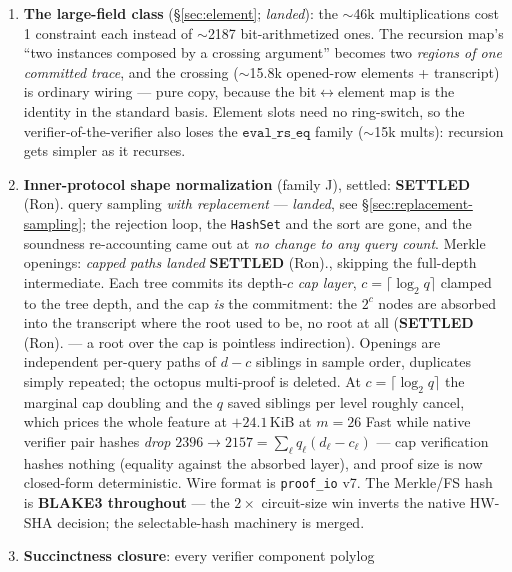 \documentclass[11pt]{article}
\newcommand{\code}[1]{\texttt{#1}}
\newcommand{\settled}[1]{\medskip\noindent\textbf{SETTLED} (#1).\xspace}
\theoremstyle{definition}
\begin{document}
\begin{enumerate}[nosep]
  \item \textbf{The large-field class} (\S\ref{sec:element};
        \emph{landed}): the $\sim$46k multiplications cost 1 constraint
        each instead of $\sim$2187 bit-arithmetized ones. The recursion
        map's ``two instances composed by a crossing argument'' becomes
        two \emph{regions of one committed trace}, and the crossing
        ($\sim$15.8k opened-row elements + transcript) is ordinary wiring
        --- pure copy, because the bit$\leftrightarrow$element map is the
        identity in the standard basis. Element slots need no
        ring-switch, so the verifier-of-the-verifier also loses the
        $\code{eval\_rs\_eq}$ family ($\sim$15k mults): recursion gets
        simpler as it recurses.
  \item \textbf{Inner-protocol shape normalization} (family J), settled:
        \settled{Ron} query sampling \emph{with replacement} ---
        \emph{landed}, see \S\ref{sec:replacement-sampling}; the rejection
        loop, the \code{HashSet} and the sort are gone, and the soundness
        re-accounting came out at \emph{no change to any query count}.
        Merkle openings: \emph{capped paths landed} \settled{Ron},
        skipping the full-depth intermediate. Each tree commits its
        depth-$c$ \emph{cap layer}, $c = \lceil \log_2 q \rceil$ clamped
        to the tree depth, and the cap \emph{is} the commitment: the
        $2^c$ nodes are absorbed into the transcript where the root used
        to be, no root at all (\settled{Ron} --- a root over the cap is
        pointless indirection). Openings are independent per-query paths
        of $d-c$ siblings in sample order, duplicates simply repeated;
        the octopus multi-proof is deleted. At $c = \lceil \log_2 q
        \rceil$ the marginal cap doubling and the $q$ saved siblings per
        level roughly cancel, which prices the whole feature at
        $+24.1$\,KiB at $m{=}26$ Fast while native verifier pair hashes
        \emph{drop} $2396 \to 2157 = \sum_\ell q_\ell (d_\ell -
        c_\ell)$ --- cap verification hashes nothing (equality against
        the absorbed layer), and proof size is now closed-form
        deterministic. Wire format is \code{proof\_io} v7.
        The Merkle/FS hash is \textbf{BLAKE3 throughout} --- the
        $2\times$ circuit-size win inverts the native HW-SHA decision;
        the selectable-hash machinery is merged.
  \item \textbf{Succinctness closure}: every verifier component polylog

\end{enumerate}
\end{document}
